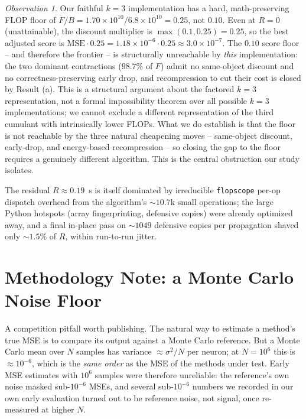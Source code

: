 \documentclass[11pt]{article}
\theoremstyle{remark}
\newtheorem{observation}{Observation}
\begin{document}
\begin{observation}
Our faithful $k{=}3$ implementation has a hard, math-preserving FLOP floor of
$F/B = 1.70\times10^{10}/6.8\times10^{10}=0.25$, not $0.10$. Even at $R=0$
(unattainable), the discount multiplier is $\max(0.1,0.25)=0.25$, so the best
adjusted score is $\text{MSE}\cdot0.25 = 1.18\times10^{-6}\cdot0.25 \approx
3.0\times10^{-7}$. The $0.10$ score floor -- and therefore the frontier -- is
structurally unreachable by \emph{this} implementation: the two dominant
contractions ($98.7\%$ of $F$) admit no same-object discount and no
correctness-preserving early drop, and recompression to cut their cost is closed
by Result (a). This is a structural argument about the factored $k{=}3$
representation, not a formal impossibility theorem over all possible $k{=}3$
implementations; we cannot exclude a different representation of the third
cumulant with intrinsically lower FLOPs. What we do establish is that the floor
is not reachable by the three natural cheapening moves -- same-object discount,
early-drop, and energy-based recompression -- so closing the gap to the floor
requires a genuinely different algorithm. This is the central obstruction our
study isolates.
\end{observation}

The residual $R\approx0.19$~s is itself dominated by irreducible
\texttt{flopscope} per-op dispatch overhead from the algorithm's $\sim\!10.7$k
small operations; the large Python hotspots (array fingerprinting, defensive
copies) were already optimized away, and a final in-place pass on $\sim\!1049$
defensive copies per propagation shaved only $\sim\!1.5\%$ of $R$, within
run-to-run jitter.

\section{Methodology Note: a Monte Carlo Noise Floor}
\label{sec:noise}

A competition pitfall worth publishing. The natural way to estimate a method's
true MSE is to compare its output against a Monte Carlo reference. But a
Monte Carlo mean over $N$ samples has variance $\approx \sigma^2/N$ per neuron;
at $N=10^6$ this is $\approx10^{-6}$, which is the \emph{same order} as the MSE
of the methods under test. Early MSE estimates with $10^6$ samples were
therefore unreliable: the reference's own noise masked sub-$10^{-6}$ MSEs, and
several sub-$10^{-6}$ numbers we recorded in our own early evaluation turned out
to be reference noise, not signal, once re-measured at higher $N$.
\end{document}
